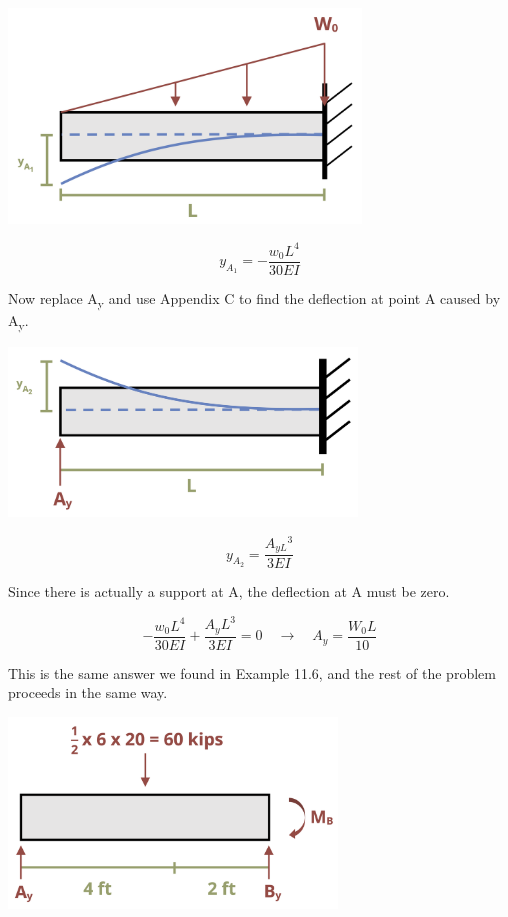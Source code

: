 \documentclass[
  letterpaper,
  DIV=11,
  numbers=noendperiod]{scrreprt}
\theoremstyle{definition}
\theoremstyle{remark}
\begin{document}
\begin{tcolorbox}
\begin{tcolorbox}
\begin{center}
\includegraphics[width=3.6875in,height=\textheight]{images/CH11 PNGs/example11.7-2.png}
\end{center}

\[
y_{A_1}=-\frac{w_0 L^4}{30 E I}
\]

Now replace A\textsubscript{y} and use Appendix C to find the deflection
at point A caused by A\textsubscript{y}.

\begin{center}
\includegraphics[width=3.64583in,height=\textheight]{images/CH11 PNGs/example11.7-3.png}
\end{center}

\[
y_{A_2}=\frac{A_{y L}{ }^3}{3 E I}
\]

Since there is actually a support at A, the deflection at A must be
zero.

\[
-\frac{w_0 L^4}{30 E I}+\frac{A_y L^3}{3EI}=0 \quad \rightarrow \quad A_y=\frac{W_0 L}{10}
\]

This is the same answer we found in Example 11.6, and the rest of the
problem proceeds in the same way.

\begin{center}
\includegraphics[width=3.4375in,height=\textheight]{images/clipboard-736394062.png}
\end{center}


\end{tcolorbox}
\end{tcolorbox}
\end{document}
